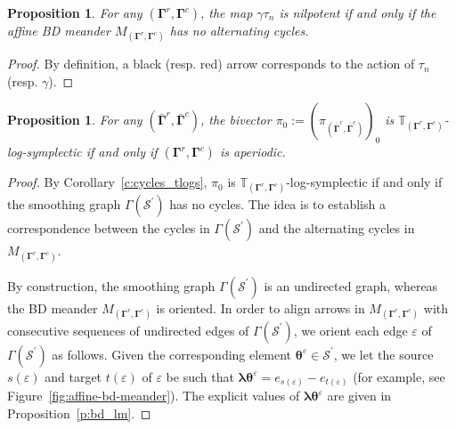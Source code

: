 \documentclass[11pt]{article}
\newcommand{\blambda}{\boldsymbol{\lambda}}
\newcommand{\btheta}{{\boldsymbol{\theta}}}
\newcommand{\bbg}{\bar{\mathbf{\Gamma}}}
\newcommand{\bg}{\mathbf{\Gamma}}
\newtheorem{proposition}[theorem]{Proposition}%
\theoremstyle{definition}\newtheorem{definition}[theorem]{Definition}
\theoremstyle{definition}\newtheorem{remark}[theorem]{Remark}
\theoremstyle{remark}
\numberwithin{equation}{section}
\begin{document}
\begin{proposition}
    For any $(\bg^r,\bg^c)$, the map $\gamma \tau_n$ is nilpotent if and only if the affine BD meander $M_{(\bg^r,\bg^c)}$ has no alternating cycles.
\end{proposition}
\begin{proof}
    By definition, a black (resp. red) arrow corresponds to the action of $\tau_n$ (resp. $\gamma$).
\end{proof}
\begin{proposition}\label{p:aperiodic_tlogsympl}
    For any $(\bbg^r,\bbg^c)$, the bivector $\pi_0 := (\pi_{(\bbg^r,\bbg^c)})_0$ is $\mathbb{T}_{(\bg^r,\bg^c)}$-log-symplectic if and only if $(\bg^r,\bg^c)$ is aperiodic.
\end{proposition}
\begin{proof}
    By Corollary~\ref{c:cycles_tlogs}, $\pi_0$ is $\mathbb{T}_{(\bg^r,\bg^c)}$-log-symplectic if and only if the smoothing graph $\Gamma(\mathcal{S}^\prime)$ has no cycles. The idea is to establish a correspondence between the cycles in $\Gamma(\mathcal{S}^\prime)$ and the alternating cycles in $M_{(\bg^r,\bg^c)}$. 

    By construction, the smoothing graph $\Gamma(\mathcal{S}^\prime)$ is an undirected graph, whereas the BD meander $M_{(\bg^r,\bg^c)}$ is oriented. In order to align arrows in $M_{(\bg^r,\bg^c)}$ with consecutive sequences of undirected edges of $\Gamma(\mathcal{S}^\prime)$, we orient each edge $\varepsilon$ of $\Gamma(\mathcal{S}^\prime)$ as follows. Given the corresponding element $\btheta^{\varepsilon} \in \mathcal{S}^\prime$, we let the source $s(\varepsilon)$ and target $t(\varepsilon)$ of $\varepsilon$ be such that $\blambda \btheta^{\varepsilon} = e_{s(\varepsilon)} - e_{t(\varepsilon)}$ (for example, see Figure~\ref{fig:affine-bd-meander}). The explicit values of $\blambda \btheta^{\varepsilon}$ are given in Proposition~\ref{p:bd_lm}.


\end{proof}
\end{document}
